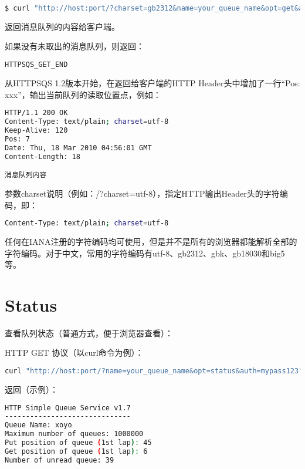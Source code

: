 \begin{lstlisting}[language=bash]
$ curl "http://host:port/?charset=gb2312&name=your_queue_name&opt=get&auth=mypass123"
\end{lstlisting}

返回消息队列的内容给客户端。

如果没有未取出的消息队列，则返回：

\begin{lstlisting}[language=bash]
HTTPSQS_GET_END
\end{lstlisting}


从HTTPSQS 1.2版本开始，在返回给客户端的HTTP Header头中增加了一行“Pos: xxx”，输出当前队列的读取位置点，例如：

\begin{lstlisting}[language=bash]
HTTP/1.1 200 OK
Content-Type: text/plain; charset=utf-8
Keep-Alive: 120
Pos: 7
Date: Thu, 18 Mar 2010 04:56:01 GMT
Content-Length: 18

消息队列内容
\end{lstlisting}



参数charset说明（例如：/?charset=utf-8），指定HTTP输出Header头的字符编码，即：


\begin{lstlisting}[language=bash]
Content-Type: text/plain; charset=utf-8
\end{lstlisting}


任何在IANA注册的字符编码均可使用，但是并不是所有的浏览器都能解析全部的字符编码。对于中文，常用的字符编码有utf-8、gb2312、gbk、gb18030和big5等。


\section{Status}


查看队列状态（普通方式，便于浏览器查看）：

HTTP GET 协议（以curl命令为例）：


\begin{lstlisting}[language=bash]
curl "http://host:port/?name=your_queue_name&opt=status&auth=mypass123"
\end{lstlisting}

返回（示例）：


\begin{lstlisting}[language=bash]
HTTP Simple Queue Service v1.7
------------------------------
Queue Name: xoyo
Maximum number of queues: 1000000
Put position of queue (1st lap): 45
Get position of queue (1st lap): 6
Number of unread queue: 39
\end{lstlisting}



